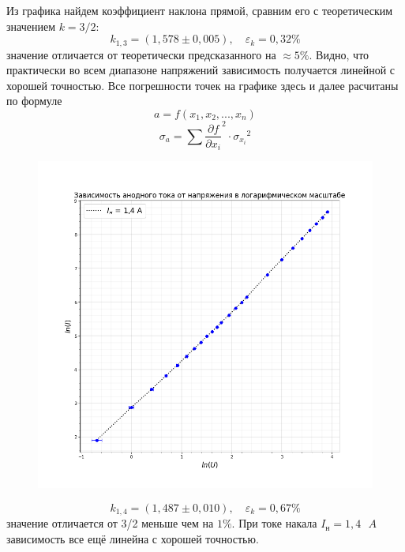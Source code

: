 \documentclass[a4paper,12pt]{article}
\begin{document}
Из графика найдем коэффициент наклона прямой, сравним его с теоретическим значением $k = 3/2$:
\[k_{1,3} = (1,578 \pm 0,005), \quad \varepsilon_k = 0,32\% \]
значение отличается от теоретически предсказанного на $\approx 5\%$. Видно, что практически во всем диапазоне напряжений зависимость получается линейной с хорошей точностью. Все погрешности точек на графике здесь и далее расчитаны по формуле
\[a = f(x_1, x_2, ... , x_n)\]
\[\sigma_a = \sum {\frac{\partial f}{\partial x_i}}^2\cdot {\sigma_{x_i}}^2\]
\begin{figure}[H]\label{fig: ln(I)(ln(U)) 1.4}
    \centering
    \includegraphics[width = \textwidth]{ln(I)(ln(U))_14.png}
\end{figure}
\[k_{1,4} = (1,487 \pm 0,010), \quad \varepsilon_k = 0,67\% \]
значение отличается от 3/2 меньше чем на $ 1\%$. При токе накала $I_н = 1,4 \text{ }A$ 
зависимость все ещё линейна с хорошей точностью.
\end{document}
